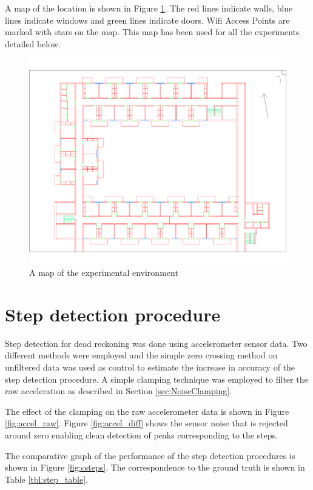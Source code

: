A map of the location is shown in Figure \ref{fig:ravindra_map}. The red lines
indicate walls, blue lines indicate windows and green lines indicate doors.
Wifi Access Points are marked with stars on the map. This map has been used
for all the experiments detailed below.

\begin{figure}
    \centering
    \includegraphics[width=5in]{figures/ravindra_map.png}
    \caption{A map of the experimental environment\label{fig:ravindra_map}}
\end{figure}



\section{Step detection procedure}

Step detection for dead reckoning was done using accelerometer sensor data.
Two different methods were employed and the simple zero crossing method on 
unfiltered data was used as control to estimate the increase in accuracy of the
step detection procedure. A simple clamping technique was employed to filter the
raw acceleration as described in Section \ref{sec:NoiseClamping}.

The effect of the clamping on the raw accelerometer data is shown in 
Figure \ref{fig:accel_raw}. Figure \ref{fig:accel_diff} shows the sensor noise
that is rejected around zero enabling clean detection of peaks corresponding to
the steps.

The comparative graph of the performance of the step detection procedures 
is shown in Figure \ref{fig:csteps}. The correspondence to the ground truth
is shown in Table \ref{tbl:step_table}.

